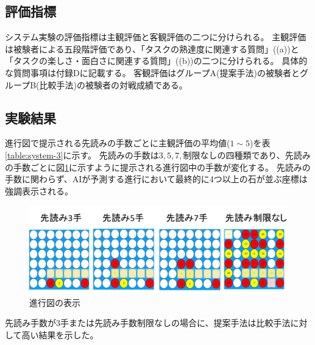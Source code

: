 \subsection{評価指標}
システム実験の評価指標は主観評価と客観評価の二つに分けられる。
主観評価は被験者による五段階評価であり、「タスクの熟達度に関連する質問」((a))と「タスクの楽しさ・面白さに関連する質問」((b))の二つに分けられる。
具体的な質問事項は付録Dに記載する。
客観評価はグループA(提案手法)の被験者とグループB(比較手法)の被験者の対戦成績である。

\subsection{実験結果}
進行図で提示される先読みの手数ごとに主観評価の平均値($1\sim5$)を表\ref{table:system-3}に示す。
先読みの手数は${3, 5, 7, \textrm{制限なし}}$の四種類であり、先読みの手数ごとに図\ref{fig:see}に示すように提示される進行図中の手数が変化する。
先読みの手数に関わらず、AIが予測する進行において最終的に4つ以上の石が並ぶ座標は強調表示される。
\begin{figure}[t]
    \centering
    \includegraphics[width=\linewidth]{./figure/see.png}
	\caption{進行図の表示}
	\label{fig:see}
\end{figure}
先読み手数が3手または先読み手数制限なしの場合に、提案手法は比較手法に対して高い結果を示した。
\begin{table}[H]
    \caption{先読み手数３手の場合}
    \scriptsize
    \centering
    \label{table:system-3}
\end{table}
